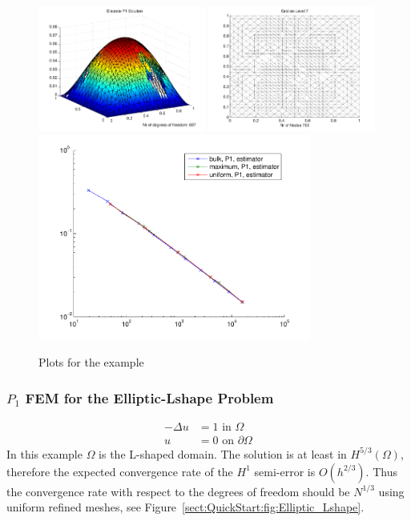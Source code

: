 \begin{figure}[ht!]
\includegraphics[width= 0.49\textwidth]{images/sect_QuickStart_Elliptic_Square_U}
\includegraphics[width= 0.49\textwidth]{images/sect_QuickStart_Elliptic_Square_Mesh}
\includegraphics[width=0.8\textwidth]{images/sect_QuickStart_Elliptic_Square_Error}
\caption{ Plots for the example }
\label{sect:QuickStart:fig:Elliptic_Square}
\end{figure}

\clearpage

\subsubsection{$P_1$ FEM for the Elliptic-Lshape Problem}
\begin{align*}
-\Delta u &= 1 \textrm{ in } \Omega\\
 u &= 0 \textrm{ on } \partial\Omega
\end{align*}
In this example $\Omega$ is the L-shaped domain.
The solution is at least in $H^{5/3}(\Omega)$,
 therefore the expected convergence rate of the $H^1$ semi-error 
is $O(h^{2/3})$. Thus the convergence rate with respect to the 
degrees of freedom should be $N^{1/3}$ using uniform refined meshes,
see Figure~\ref{sect:QuickStart:fig:Elliptic_Lshape}.\bigskip

